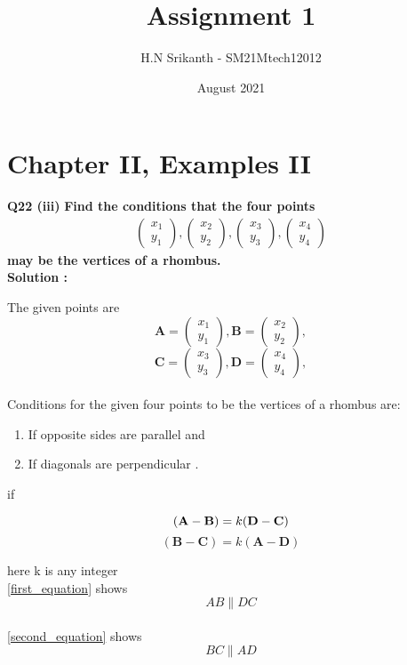 \documentclass{article}
\title{\textbf{\Huge Assignment 1}}
\author{\large H.N Srikanth - SM21Mtech12012}
\date{August 2021}
\begin{document}
\providecommand{\mbf}{\mathbf}

\newcommand{\myvec}[1]{\ensuremath{\begin{pmatrix}#1\end{pmatrix}}}
\let\vec\mathbf

\maketitle

\section*{Chapter II, Examples II}
\textbf{Q22 (iii)}
\textbf{Find the conditions that the four points}
\begin{align}
\myvec{x_1\\y_1}, \myvec{x_2\\y_2},
\myvec{x_3\\y_3}, \myvec{x_4\\y_4}
\end{align}
\textbf{ may be the vertices of a rhombus.}\\

\textbf{Solution :}

The given points are\\
$$\vec{A} = \myvec{x_1\\y_1}, \vec{B} =\myvec{x_2\\y_2},$$
$$\vec{C} =\myvec{x_3\\y_3}, \vec{D} =\myvec{x_4\\y_4},$$\\
Conditions for the given four points to be the vertices of a rhombus are:
\begin{enumerate}
  \item If opposite sides are parallel and
  \item If diagonals are perpendicular .
\end{enumerate}
if

\begin{equation}\label{first_equation}
(\vec{A}-\vec{B} ) = k(\vec{D}-\vec{C} )\\
\end{equation}
\begin{equation}\label{second_equation}
(\vec{B}-\vec{C} )=k(\vec{A}-\vec{D} )
\end{equation}

here k is any integer\\
\ref{first_equation} shows 
$$AB \parallel DC $$\\
\ref{second_equation} shows 
$$BC \parallel AD$$
\end{document}
